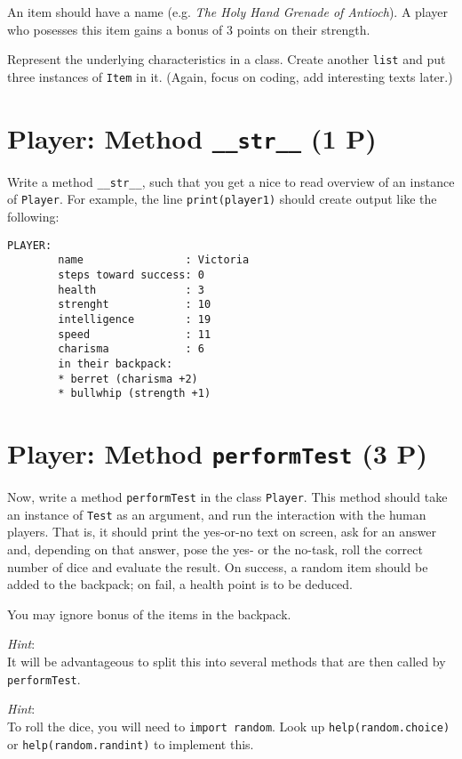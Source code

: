 \documentclass[
	english,
	fontsize=10pt,
	parskip=half,
	titlepage=true,
	DIV=12
]{scrartcl}
\newcommand*{\inPy}[1]{\texttt{#1}}
\newcommand*{\eg}{e.\;g. }
\begin{document}
An item should have a name (\eg \emph{The Holy Hand Grenade of Antioch}). A player who posesses this item gains a bonus of 3 points on their strength.

Represent the underlying characteristics in a class. Create another \inPy{list} and put three instances of \texttt{Item} in it. (Again, focus on coding, add interesting texts later.)


\section{Player: Method \texttt{\_\_str\_\_} (1 P)}
Write a method \inPy{__str__}, such that you get a nice to read overview of an instance of \texttt{Player}. For example, the line \inPy{print(player1)} should create output like the following:

\begin{verbatim}
PLAYER:
        name                : Victoria
        steps toward success: 0
        health              : 3
        strenght            : 10
        intelligence        : 19
        speed               : 11
        charisma            : 6
        in their backpack:
        * berret (charisma +2)
        * bullwhip (strength +1)
\end{verbatim}

\section{Player: Method \texttt{performTest} (3 P)}
Now, write a method \texttt{performTest} in the class \texttt{Player}. This method should take an instance of \texttt{Test} as an argument, and run the interaction with the human players. That is, it should print the yes-or-no text on screen, ask for an answer and, depending on that answer, pose the yes- or the no-task, roll the correct number of dice and evaluate the result. On success, a random item should be added to the backpack; on fail, a health point is to be deduced.

You may ignore bonus of the items in the backpack.

\emph{Hint}:\\
It will be advantageous to split this into several methods that are then called by \texttt{performTest}.

\emph{Hint}:\\
To roll the dice, you will need to \inPy{import random}. Look up \inPy{help(random.choice)} or \inPy{help(random.randint)} to implement this.
\end{document}
